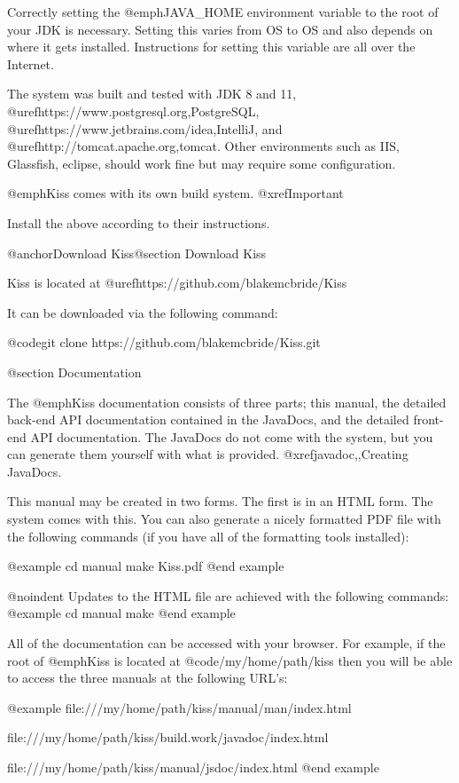 Correctly setting the @emph{JAVA_HOME} environment variable to the root of your
JDK is necessary.  Setting this varies from OS to OS and also depends on where it
gets installed.  Instructions for setting this variable are all over the Internet.

The system was built and tested with JDK 8 and 11,
@uref{https://www.postgresql.org,PostgreSQL},
@uref{https://www.jetbrains.com/idea,IntelliJ}, and
@uref{http://tomcat.apache.org,tomcat}.  Other environments such as
IIS, Glassfish, eclipse, should work fine but may require some
configuration.

@emph{Kiss} comes with its own build system.  @xref{Important}

Install the above according to their instructions.

@anchor{Download Kiss}@section Download Kiss

Kiss is located at @uref{https://github.com/blakemcbride/Kiss}

It can be downloaded via the following command:

@code{git clone https://github.com/blakemcbride/Kiss.git}

@section Documentation

The @emph{Kiss} documentation consists of three parts; this manual,
the detailed back-end API documentation contained in the JavaDocs, and
the detailed front-end API documentation.  The JavaDocs do not come
with the system, but you can generate them yourself with what is
provided.  @xref{javadoc,,Creating JavaDocs}.

This manual may be created in two forms.  The first is in an HTML
form.  The system comes with this.  You can also generate a nicely
formatted PDF file with the following commands (if you have all of the
formatting tools installed):

@example
cd manual
make Kiss.pdf
@end example

@noindent
Updates to the HTML file are achieved with the following commands:
@example
cd manual
make
@end example

All of the documentation can be accessed with your browser.  For
example, if the root of @emph{Kiss} is located at
@code{/my/home/path/kiss} then you will be able to access the three
manuals at the following URL's:

@example
file:///my/home/path/kiss/manual/man/index.html

file:///my/home/path/kiss/build.work/javadoc/index.html

file:///my/home/path/kiss/manual/jsdoc/index.html
@end example


